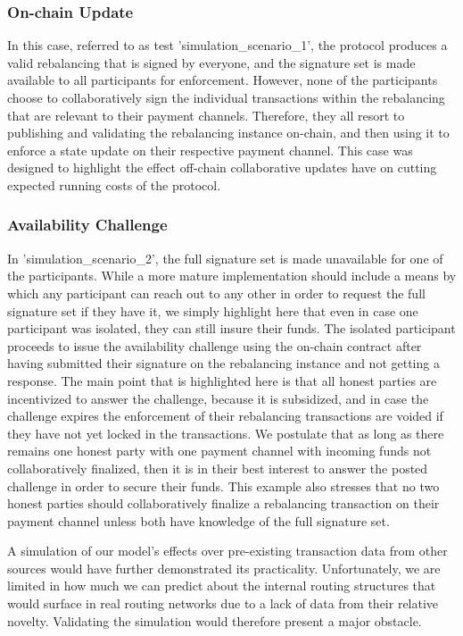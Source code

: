 \documentclass[sigconf]{acmart}
\begin{document}
\subsubsection{On-chain Update}

In this case, referred to as test 'simulation\_scenario\_1', the protocol produces a valid rebalancing that is signed by everyone, and the signature set is made available to all participants for enforcement.
However, none of the participants choose to collaboratively sign the individual transactions within the rebalancing that are relevant to their payment channels. Therefore, they all resort to publishing and validating the rebalancing instance on-chain, and then using it to enforce a state update on their respective payment channel.
This case was designed to highlight the effect off-chain collaborative updates have on cutting expected running costs of the protocol.

\subsubsection{Availability Challenge}

In 'simulation\_scenario\_2', the full signature set is made unavailable for one of the participants. While a more mature implementation should include a means by which any participant can reach out to any other in order to request the full signature set if they have it, we simply highlight here that even in case one participant was isolated, they can still insure their funds.
The isolated participant proceeds to issue the availability challenge using the on-chain contract after having submitted their signature on the rebalancing instance and not getting a response. The main point that is highlighted here is that all honest parties are incentivized to answer the challenge, because it is subsidized, and in case the challenge expires the enforcement of their rebalancing transactions are voided if they have not yet locked in the transactions.
We postulate that as long as there remains one honest party with one payment channel with incoming funds not collaboratively finalized, then it is in their best interest to answer the posted challenge in order to secure their funds. This example also stresses that no two honest parties should collaboratively finalize a rebalancing transaction on their payment channel unless both have knowledge of the full signature set.

{\color{blue}A simulation of our model's effects over pre-existing transaction data from other sources would have further demonstrated its practicality. Unfortunately, we are limited in how much we can predict about the internal routing structures that would surface in real routing networks due to a lack of data from their relative novelty. Validating the simulation would therefore present a major obstacle.}
\end{document}
